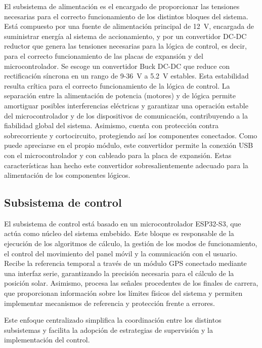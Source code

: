 El subsistema de alimentación es el encargado de proporcionar las tensiones necesarias para el correcto funcionamiento de los distintos bloques del sistema. Está compuesto por una fuente de alimentación principal de 12~V, encargada de suministrar energía al sistema de accionamiento, y por un convertidor DC-DC reductor que genera las tensiones necesarias para la lógica de control, es decir, para el correcto funcionamiento de las placas de expansión y del microcontrolador. Se escoge un convertidor Buck DC-DC que reduce con rectificación síncrona en un rango de 9-36~V a 5.2~V estables. Esta estabilidad resulta crítica para el correcto funcionamiento de la lógica de control. La separación entre la alimentación de potencia (motores) y de lógica permite amortiguar posibles interferencias eléctricas y garantizar una operación estable del microcontrolador y de los dispositivos de comunicación, contribuyendo a la fiabilidad global del sistema. Asimismo, cuenta con protección contra sobrecorriente y cortocircuito, protegiendo así los componentes conectados. Como puede apreciarse en el propio módulo, este convertidor permite la conexión USB con el microcontrolador y con cableado para la placa de expansión. Estas características han hecho este convertidor sobresalientemente adecuado para la alimentación de los componentes lógicos.

\subsection{Subsistema de control}

El subsistema de control está basado en un microcontrolador ESP32-S3, que actúa como núcleo del sistema embebido. Este bloque es responsable de la ejecución de los algoritmos de cálculo, la gestión de los modos de funcionamiento, el control del movimiento del panel móvil y la comunicación con el usuario. Recibe la referencia temporal a través de un módulo GPS conectado mediante una interfaz serie, garantizando la precisión necesaria para el cálculo de la posición solar. Asimismo, procesa las señales procedentes de los finales de carrera, que proporcionan información sobre los límites físicos del sistema y permiten implementar mecanismos de referencia y protección frente a errores.

Este enfoque centralizado simplifica la coordinación entre los distintos subsistemas y facilita la adopción de estrategias de supervisión y la implementación del control.


